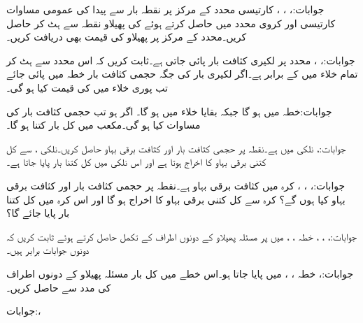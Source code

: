 جوابات:، ، ، 
کارتیسی محدد کے مرکز  پر نقطہ بار  سے پیدا  کی عمومی مساوات کارتیسی اور کروی محدد میں حاصل کرتے ہوئے  کی پھیلاو نقطہ  سے ہٹ کر حاصل کریں۔محدد کے مرکز پر پھیلاو کی قیمت بھی دریافت کریں۔  

جوابات:، ،
 محدد پر لکیری کثافت بار  پائی جاتی ہے۔ثابت کریں کہ اس محدد سے ہٹ کر تمام خلاء میں  کے برابر ہے۔اگر لکیری بار کی جگہ حجمی کثافت بار  خطہ  میں پائی جائے تب پوری خلاء میں  کی قیمت کیا ہو گی۔

جوابات:خطہ  میں  ہو گا جبکہ بقایا خلاء میں  ہو گا۔
اگر  ہو تب حجمی کثافت بار کی مساوات کیا ہو گی۔مکعب  میں کل بار کتنا ہو گا۔

جوابات:، 
نلکی  میں  ہے۔نقطہ  پر حجمی کثافت بار اور کثافت برقی بہاو حاصل کریں۔نلکی ،  سے کل کتنی برقی بہاو کا اخراج ہوتا ہے اور اس نلکی میں کل کتنا بار پایا جاتا ہے۔

جوابات:، ، ،
کرہ  میں کثافت برقی بہاو  ہے۔نقطہ  پر حجمی کثافت بار اور کثافت برقی بہاو کیا ہوں گے؟ کرہ  سے کل کتنی برقی بہاو کا اخراج ہو گا اور اس کرہ میں کل کتنا بار پایا جائے گا؟

جوابات:، ، ، 
خطہ ، ،  میں  پر مسئلہ پھیلاو کے دونوں اطراف کے تکمل حاصل کرتے ہوئے ثابت کریں کہ دونوں جوابات برابر ہیں۔

جوابات:،  
خطہ ، ،  میں  پایا جاتا ہو۔اس خطے میں کل بار مسئلہ پھیلاو کے دونوں اطراف کی مدد سے حاصل کریں۔

جوابات:، 
